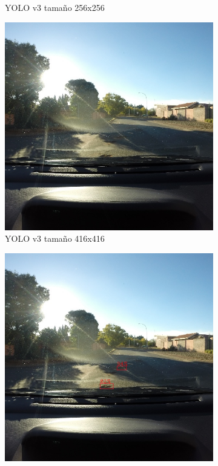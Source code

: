 \begin{figure}[H]
\begin{subfigure}[h]{0.45\linewidth}
		\caption{YOLO v3 tamaño 256x256}
	\end{subfigure}
	\begin{subfigure}[h]{0.45\linewidth}
		\includegraphics[width=\linewidth]{images/results_c_yolo_v3_416.jpg}
		\caption{YOLO v3 tamaño 416x416}
	\end{subfigure}
	\begin{subfigure}[h]{0.45\linewidth}
		\includegraphics[width=\linewidth]{images/results_c_yolo_v3_640.jpg}

\end{subfigure}
\end{figure}
